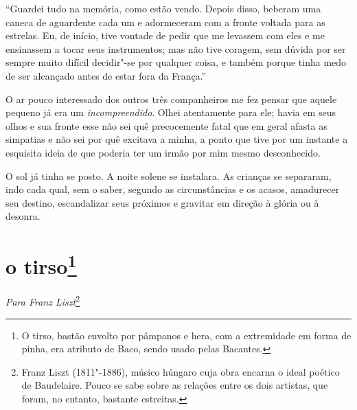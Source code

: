 “Guardei tudo na memória, como estão vendo. Depois disso, 
beberam uma caneca de aguardente cada um e adormeceram com a fronte
voltada para as estrelas. Eu, de início, tive vontade de
pedir que me levassem com eles e me ensinassem a tocar seus
instrumentos; mas não tive coragem, sem dúvida por ser sempre muito
difícil decidir"-se por qualquer coisa, e também porque tinha medo
de ser alcançado antes de estar fora da França.''

O ar pouco interessado dos outros três companheiros me fez pensar
que aquele pequeno já era um \textit{incompreendido}. Olhei atentamente para ele;
havia em seus olhos e sua fronte esse não sei quê precocemente fatal
que em geral afasta as simpatias e não sei por quê excitava a
minha, a ponto que tive por um instante a esquisita ideia de que 
poderia ter um irmão por mim mesmo desconhecido.

O sol já tinha se posto. A noite solene se instalara. As crianças se
separaram, indo cada qual, sem o saber, segundo as circunstâncias e
os acasos, amadurecer seu destino, escandalizar seus próximos e
gravitar em direção à glória ou à desonra.

\quebra\section[O tirso]{o tirso\protect\footnote{  O tirso, bastão envolto por pâmpanos e hera, com a extremidade em
forma de pinha, era atributo de Baco, sendo usado pelas Bacantes.}}

\begin{flushright}
\textit{Para Franz Liszt}\protect\footnote{ Franz Liszt (1811"-1886), músico húngaro cuja obra encarna o ideal
poético de Baudelaire. Pouco se sabe sobre as relações entre os dois
artistas, que foram, no entanto, bastante estreitas.}
\end{flushright}\medskip

